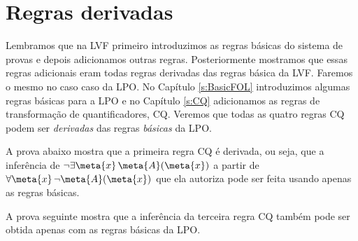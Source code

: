 \chapter{Regras derivadas}\label{s:DerivedFOL}
Lembramos que na LVF primeiro introduzimos as regras básicas do sistema de provas e depois adicionamos outras regras.  Posteriormente mostramos que essas regras adicionais eram todas regras derivadas das regras básica da LVF. Faremos o mesmo no caso caso da LPO.  No  Capítulo  \ref{s:BasicFOL} introduzimos algumas regras básicas para a LPO e no Capítulo  \ref{s:CQ} adicionamos  as  regras de transformação de quantificadores, CQ.  Veremos que todas as quatro regras CQ podem ser \emph{derivadas} das regras \emph{básicas} da LPO.  

A prova abaixo mostra que a primeira regra CQ é derivada, ou seja, que a inferência de $\enot\exists \meta{x}\, \atom{\meta{A}}{\meta{x}}$ a partir de $\forall \meta{x}\, \enot \atom{\meta{A}}{\meta{x}}$ que ela autoriza pode ser feita usando apenas as regras básicas.
\begin{fitchproof}
	\open
		\open
		\close
	\close
\end{fitchproof}
A prova seguinte mostra que a inferência da terceira regra CQ também pode ser obtida apenas com as regras básicas da LPO.  
   
\begin{fitchproof}
	\open
		\open
		\close
	\close
\end{fitchproof}
 
